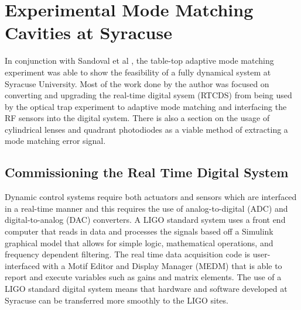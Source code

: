 \chapter{Experimental Mode Matching Cavities at Syracuse}
In conjunction with Sandoval et al \cite{Fabian_Thesis}, the table-top adaptive mode matching experiment was able to show the feasibility of a fully dynamical system at Syracuse University.  Most of the work done by the author was focused on converting and upgrading the real-time digital sysem (RTCDS) from being used by the optical trap experiment \cite{OpticalTrap} to adaptive mode matching and interfacing the RF sensors into the digital system.  There is also a section on the usage of cylindrical lenses and quadrant photodiodes as a viable method of extracting a mode matching error signal.

\section{Commissioning the Real Time Digital System}
	Dynamic control systems require both actuators and sensors which are interfaced in a real-time manner and this requires the use of analog-to-digital (ADC) and digital-to-analog (DAC) converters.  A LIGO standard system uses a front end computer that reads in data and processes the signals based off a Simulink graphical model that allows for simple logic, mathematical operations, and frequency dependent filtering.  The real time data acquisition code is user-interfaced with a Motif Editor and Display Manager (MEDM) that is able to report and execute variables such as gains and matrix elements.  The use of a LIGO standard digital system means that hardware and software developed at Syracuse can be transferred more smoothly to the LIGO sites.
	

